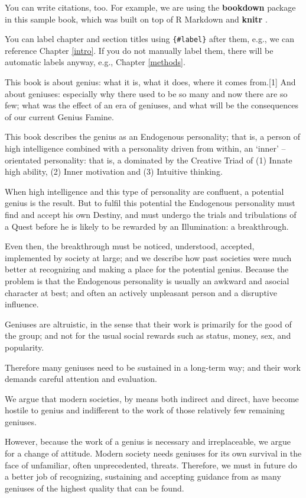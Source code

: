 \documentclass[
]{book}
\begin{document}
You can write citations, too. For example, we are using the \textbf{bookdown} package \citep{R-bookdown} in this sample book, which was built on top of R Markdown and \textbf{knitr} \citep{xie2015}.

You can label chapter and section titles using \texttt{\{\#label\}} after them, e.g., we can reference Chapter \ref{intro}. If you do not manually label them, there will be automatic labels anyway, e.g., Chapter \ref{methods}.

This book is about genius: what it is, what it does, where it comes from.{[}1{]}
And about geniuses: especially why there used to be so many and now there are so few; what was the effect of an era of geniuses, and what will be the consequences of our current Genius Famine.

This book describes the genius as an Endogenous personality; that is, a person of high intelligence combined with a personality driven from within, an `inner' --orientated personality: that is, a dominated by the Creative Triad of (1) Innate high ability, (2) Inner motivation and (3) Intuitive thinking.

When high intelligence and this type of personality are confluent, a potential genius is the result. But to fulfil this potential the Endogenous personality must find and accept his own Destiny, and must undergo the trials and tribulations of a Quest before he is likely to be rewarded by an Illumination: a breakthrough.

Even then, the breakthrough must be noticed, understood, accepted, implemented by society at large; and we describe how past societies were much better at recognizing and making a place for the potential genius. Because the problem is that the Endogenous personality is usually an awkward and asocial character at best; and often an actively unpleasant person and a disruptive influence.

Geniuses are altruistic, in the sense that their work is primarily for the good of the group; and not for the usual social rewards such as status, money, sex, and popularity.

Therefore many geniuses need to be sustained in a long-term way; and their work demands careful attention and evaluation.

We argue that modern societies, by means both indirect and direct, have become hostile to genius and indifferent to the work of those relatively few remaining geniuses.

However, because the work of a genius is necessary and irreplaceable, we argue for a change of attitude. Modern society needs geniuses for its own survival in the face of unfamiliar, often unprecedented, threats. Therefore, we must in future do a better job of recognizing, sustaining and accepting guidance from as many geniuses of the highest quality that can be found.
\end{document}

